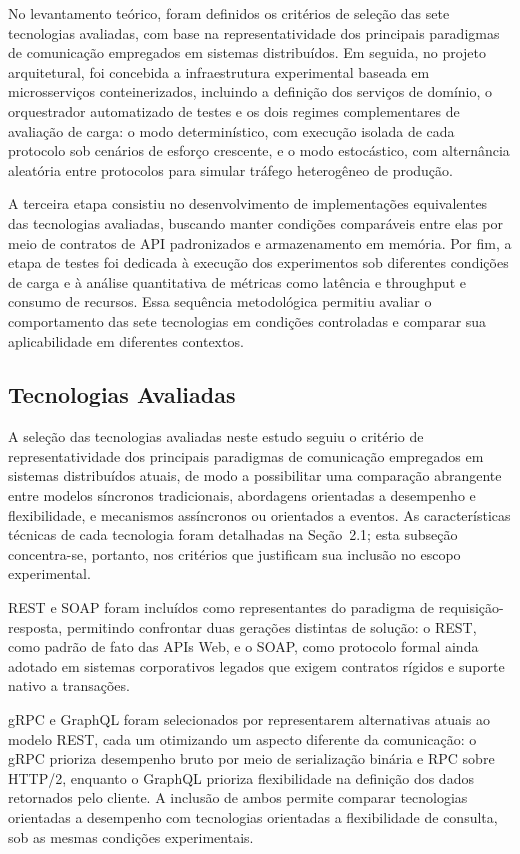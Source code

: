 \documentclass[a4paper,12pt]{article}
\begin{document}
No levantamento teórico, foram definidos os critérios de seleção das sete tecnologias avaliadas, com base na representatividade dos principais paradigmas de comunicação empregados em sistemas distribuídos. Em seguida, no projeto arquitetural, foi concebida a infraestrutura experimental baseada em microsserviços conteinerizados, incluindo a definição dos serviços de domínio, o orquestrador automatizado de testes e os dois regimes complementares de avaliação de carga: o modo determinístico, com execução isolada de cada protocolo sob cenários de esforço crescente, e o modo estocástico, com alternância aleatória entre protocolos para simular tráfego heterogêneo de produção.

A terceira etapa consistiu no desenvolvimento de implementações equivalentes das tecnologias avaliadas, buscando manter condições comparáveis entre elas por meio de contratos de API padronizados e armazenamento em memória. Por fim, a etapa de testes foi dedicada à execução dos experimentos sob diferentes condições de carga e à análise quantitativa de métricas como latência e throughput e consumo de recursos. Essa sequência metodológica permitiu avaliar o comportamento das sete tecnologias em condições controladas e comparar sua aplicabilidade em diferentes contextos.

\subsection{Tecnologias Avaliadas}

A seleção das tecnologias avaliadas neste estudo seguiu o critério de representatividade dos principais paradigmas de comunicação empregados em sistemas distribuídos atuais, de modo a possibilitar uma comparação abrangente entre modelos síncronos tradicionais, abordagens orientadas a desempenho e flexibilidade, e mecanismos assíncronos ou orientados a eventos. As características técnicas de cada tecnologia foram detalhadas na Seção~2.1; esta subseção concentra-se, portanto, nos critérios que justificam sua inclusão no escopo experimental.

REST e SOAP foram incluídos como representantes do paradigma de requisição-resposta, permitindo confrontar duas gerações distintas de solução: o REST, como padrão de fato das APIs Web, e o SOAP, como protocolo formal ainda adotado em sistemas corporativos legados que exigem contratos rígidos e suporte nativo a transações.

gRPC e GraphQL foram selecionados por representarem alternativas atuais ao modelo REST, cada um otimizando um aspecto diferente da comunicação: o gRPC prioriza desempenho bruto por meio de serialização binária e RPC sobre HTTP/2, enquanto o GraphQL prioriza flexibilidade na definição dos dados retornados pelo cliente. A inclusão de ambos permite comparar tecnologias orientadas a desempenho com tecnologias orientadas a flexibilidade de consulta, sob as mesmas condições experimentais.
\end{document}
